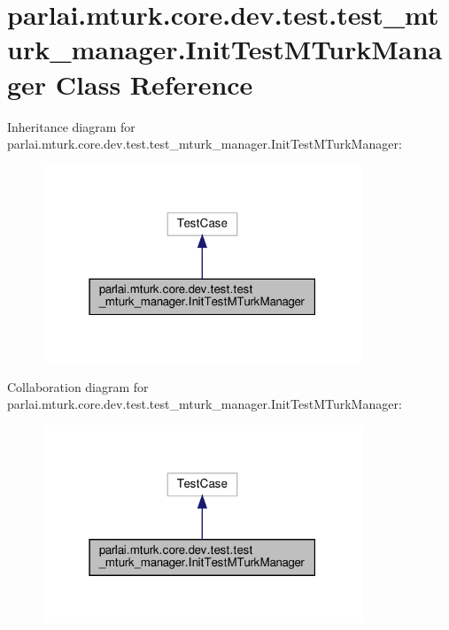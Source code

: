 \hypertarget{classparlai_1_1mturk_1_1core_1_1dev_1_1test_1_1test__mturk__manager_1_1InitTestMTurkManager}{}\section{parlai.\+mturk.\+core.\+dev.\+test.\+test\+\_\+mturk\+\_\+manager.\+Init\+Test\+M\+Turk\+Manager Class Reference}
\label{classparlai_1_1mturk_1_1core_1_1dev_1_1test_1_1test__mturk__manager_1_1InitTestMTurkManager}


Inheritance diagram for parlai.\+mturk.\+core.\+dev.\+test.\+test\+\_\+mturk\+\_\+manager.\+Init\+Test\+M\+Turk\+Manager\+:
\nopagebreak
\begin{figure}[H]
\begin{center}
\leavevmode
\includegraphics[width=271pt]{df/d85/classparlai_1_1mturk_1_1core_1_1dev_1_1test_1_1test__mturk__manager_1_1InitTestMTurkManager__inherit__graph}
\end{center}
\end{figure}


Collaboration diagram for parlai.\+mturk.\+core.\+dev.\+test.\+test\+\_\+mturk\+\_\+manager.\+Init\+Test\+M\+Turk\+Manager\+:
\nopagebreak
\begin{figure}[H]
\begin{center}
\leavevmode
\includegraphics[width=271pt]{d2/d3d/classparlai_1_1mturk_1_1core_1_1dev_1_1test_1_1test__mturk__manager_1_1InitTestMTurkManager__coll__graph}
\end{center}
\end{figure}

